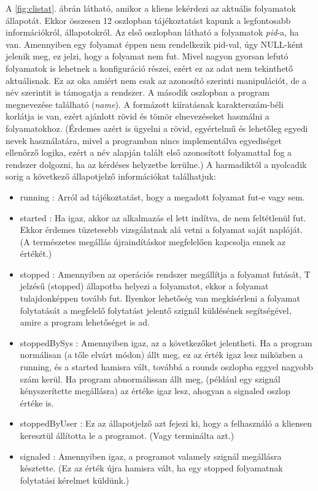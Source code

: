 \documentclass[12pt]{report}
\begin{document}
  A \ref{fig:clistat}. ábrán látható, amikor a kliens lekérdezi az aktuális folyamatok állapotát. Ekkor összesen 12 oszlopban tájékoztatást kapunk a legfontosabb információkról, állapotokról. Az első oszlopban látható a folyamatok \textit{pid}-a, ha van. Amennyiben egy folyamat éppen nem rendelkezik pid-val, úgy NULL-ként jelenik meg, ez jelzi, hogy a folyamat nem fut. Mivel nagyon gyorsan lefutó folyamatok is lehetnek a konfiguráció részei, ezért ez az adat nem tekinthető aktuálisnak. Ez az oka amiért nem csak az azonosító szerinti manipulációt, de a név szerintit is támogatja a rendszer.
  A második oszlopban a program megnevezése található (\textit{name}). A formázott kiíratásnak karakterszám-béli korlátja is van, ezért ajánlott rövid és tömör elnevezéseket használni a folyamatokhoz. (Érdemes azért is ügyelni a rövid, egyértelmű és lehetőleg egyedi nevek használatára, mivel a programban nincs implementálva egyediséget ellenőrző logika, ezért a név alapján talált első azonosított folyamattal fog a rendszer dolgozni, ha az kérdéses helyzetbe kerülne.)
  A harmadiktól a nyolcadik sorig a következő állapotjelző információkat találhatjuk:
  \begin{itemize}
  \item running : Arról ad tájékoztatást, hogy a megadott folyamat fut-e vagy sem. 
  \item started : Ha igaz, akkor az alkalmazás el lett indítva, de nem feltétlenül fut. Ekkor érdemes tüzetesebb vizsgálatnak alá vetni a folyamat saját naplóját. (A természetes megállás újraindításkor megfelelően kapcsolja ennek az értékét.)
  \item stopped : Amennyiben az operációs rendszer megállítja a folyamat futását, T jelzésű (stopped) állapotba helyezi a folyamatot, ekkor a folyamat tulajdonképpen tovább fut. Ilyenkor lehetőség van megkísérleni a folyamat folytatását a megfelelő folytatást jelentő szignál küldésének segítségével, amire a program lehetőséget is ad.  
  \item stoppedBySys : Amennyiben igaz, az a következőket jelentheti. Ha a program normálisan (a tőle elvárt módon) állt meg, ez az érték igaz lesz miközben a running, és a started hamisra vált, továbbá a rounds oszlopba eggyel nagyobb szám kerül. Ha program abnormálissan állt meg, (például egy szignál kényszerítette megállásra) az értéke igaz lesz, ahogyan a signaled oszlop értéke is.
  \item stoppedByUser : Ez az állapotjelző azt fejezi ki, hogy a felhasználó a kliensen keresztül állította le a programot. (Vagy terminálta azt.)
  \item signaled : Amennyiben igaz, a programot valamely szignál megállásra késztette. (Ez az érték újra hamisra vált, ha egy stopped folyamatnak folytatási kérelmet küldünk.)
  \end{itemize}
\end{document}
